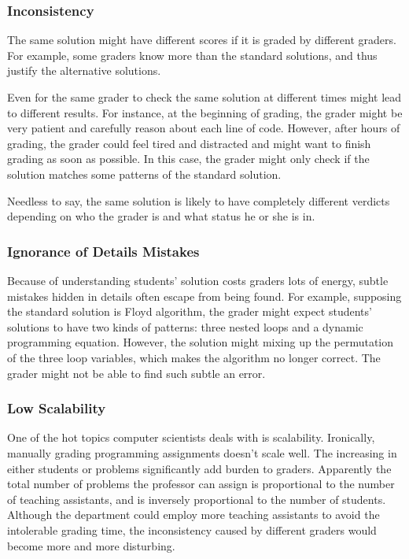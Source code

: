         \subsubsection{Inconsistency}

            The same solution might have different scores if it is graded by different graders.
            For example, some graders know more than the standard solutions,
            and thus justify the alternative solutions.

            Even for the same grader to check the same solution at different times might lead to different results.
            For instance, at the beginning of grading, the grader might be very patient
            and carefully reason about each line of code.
            However, after hours of grading, the grader could feel tired and distracted
            and might want to finish grading as soon as possible.
            In this case, the grader might only check if the solution matches some patterns of the standard solution.

            Needless to say, the same solution is likely to have completely different verdicts
            depending on who the grader is and what status he or she is in.

        \subsubsection{Ignorance of Details Mistakes}

            Because of understanding students' solution costs graders lots of energy,
            subtle mistakes hidden in details often escape from being found.
            For example, supposing the standard solution is Floyd algorithm, 
            the grader might expect students' solutions to have two kinds of patterns:
            three nested loops and a dynamic programming equation.
            However, the solution might mixing up the permutation of the three loop variables,
            which makes the algorithm no longer correct.
            The grader might not be able to find such subtle an error.

        \subsubsection{Low Scalability}

            One of the hot topics computer scientists deals with is scalability.
            Ironically, manually grading programming assignments doesn't scale well.
            The increasing in either students or problems significantly add burden to graders.
            Apparently the total number of problems the professor can assign is proportional to
            the number of teaching assistants, and is inversely proportional to the number of students.
            Although the department could employ more teaching assistants to avoid the intolerable grading time,
            the inconsistency caused by different graders would become more and more disturbing.

